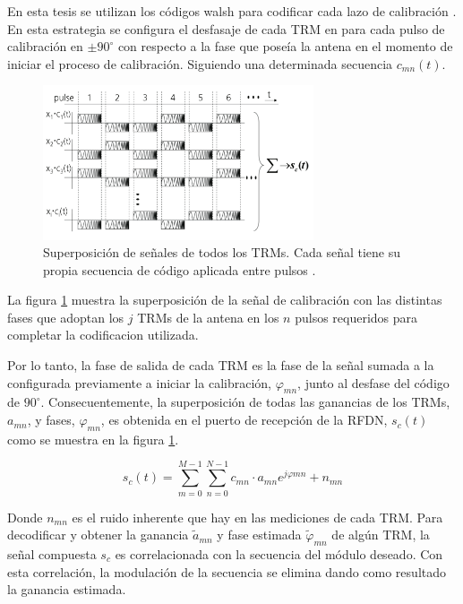 En esta tesis se utilizan los códigos walsh para codificar cada lazo de calibración \cite{Singhal2012}. En esta estrategia se
configura el desfasaje de cada TRM en para cada pulso de calibración en $\pm90^{\circ}$ con respecto a la fase que poseía la
antena en el momento de iniciar el proceso de calibración. Siguiendo una determinada secuencia $c_{mn}(t)$.

\begin{figure}
 \centering
 \includegraphics[width=8cm]{gfx/superposition_signals_classic.png}
 \caption{Superposición de señales de todos los TRMs. Cada señal tiene su propia secuencia de código aplicada entre pulsos
 \cite{Br2007}.}
 \label{fig:sup_sign_classic}
\end{figure}

La figura \ref{fig:sup_sign_classic} muestra la superposición de la señal de calibración con las distintas fases que adoptan
los $j$ TRMs de la antena en los $n$ pulsos requeridos para completar la codificacion utilizada.

Por lo tanto, la fase de salida de cada TRM es la fase de la señal sumada a la configurada previamente a iniciar la
calibración, $\varphi_{mn}$, junto al desfase del código de $90^{\circ}$. Consecuentemente, la superposición de todas las
ganancias de los TRMs, $a_{mn}$, y fases, $\varphi_{mn}$, es obtenida en el puerto de recepción de la RFDN, $s_c(t)$ como se
muestra en la figura \ref{fig:sup_sign_classic}.

\begin{equation}
	s_c(t) = \sum_{m=0}^{M-1}\sum_{n=0}^{N-1}c_{mn}\cdot a_{mn}e^{j\varphi{mn}} + n_{mn}
\end{equation}

Donde $n_{mn}$ es el ruido inherente que hay en las mediciones de cada TRM. Para decodificar y obtener la ganancia
$\tilde{a}_{mn}$ y fase estimada $\tilde\varphi_{mn}$ de algún TRM, la señal compuesta $s_c$ es correlacionada con
la secuencia del módulo deseado. Con esta correlación, la modulación de la secuencia se elimina dando como resultado
la ganancia estimada.

